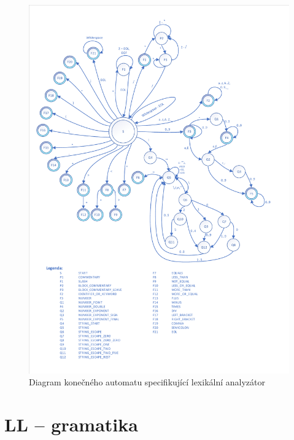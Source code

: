 \documentclass[a4paper, 11pt]{article}
\begin{document}
	\begin{figure}[!ht]
		\centering
		\vspace{-1.2cm}
		\includegraphics[width=0.95\linewidth]{inc/FA_graph.pdf}
		\caption{Diagram konečného automatu specifikující lexikální analyzátor}
		\label{figure:fa_graph}
	\end{figure}
	\clearpage

	\section{LL -- gramatika}
\end{document}
